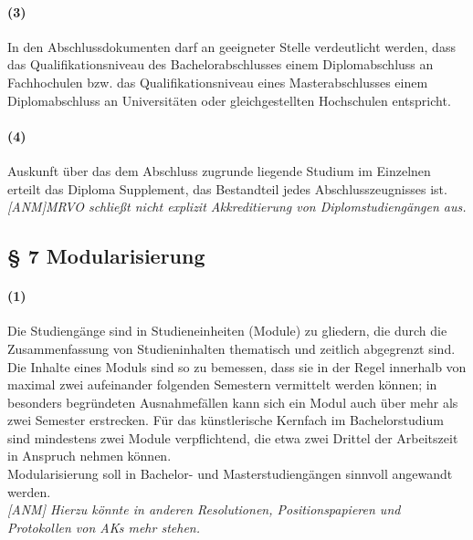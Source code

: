 \documentclass[a4paper]{scrartcl}
\begin{document}
\paragraph{(3)} In den Abschlussdokumenten darf an geeigneter Stelle verdeutlicht werden, dass das Qualifikationsniveau des Bachelorabschlusses einem Diplomabschluss an Fachhochulen bzw. das Qualifikationsniveau eines Masterabschlusses einem Diplomabschluss an Universitäten oder gleichgestellten Hochschulen entspricht.
\paragraph{(4)} Auskunft über das dem Abschluss zugrunde liegende Studium im Einzelnen erteilt das Diploma Supplement, das Bestandteil jedes Abschlusszeugnisses ist.\\

\emph{\textcolor{Brutus}{[ANM]MRVO schließt nicht explizit Akkreditierung von Diplomstudiengängen aus.}}

\subsection{§ 7 Modularisierung}
\paragraph{(1)} Die Studiengänge sind in Studieneinheiten (Module) zu gliedern, die durch die Zusammenfassung von Studieninhalten thematisch und zeitlich abgegrenzt sind. Die Inhalte eines Moduls sind so zu bemessen, dass sie in der Regel innerhalb von maximal zwei aufeinander folgenden Semestern vermittelt werden können; in besonders begründeten Ausnahmefällen kann sich ein Modul auch über mehr als zwei Semester erstrecken. Für das künstlerische Kernfach im Bachelorstudium sind mindestens zwei Module verpflichtend, die etwa zwei Drittel der Arbeitszeit in Anspruch nehmen
können.\\

\textcolor{Bernd}{\textbf{\cite{RESO: SoSe2002-RL}} Modularisierung soll in Bachelor- und Masterstudiengängen sinnvoll angewandt werden.}\\

\emph{\textcolor{Brutus}{[ANM] Hierzu könnte in anderen Resolutionen, Positionspapieren und Protokollen von AKs mehr stehen.}}
\end{document}
